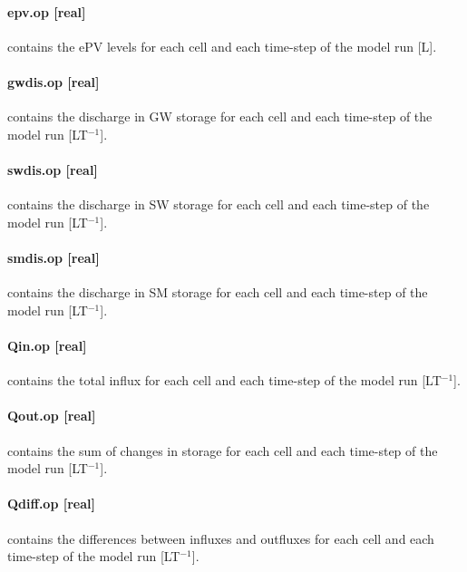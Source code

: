 \paragraph*{epv.op [real]} contains the ePV levels for each cell and each time-step of the model run [L].

\paragraph*{gw\textunderscore dis.op [real]} contains the discharge in GW storage for each cell and each time-step of the model run [LT$^{-1}$].

\paragraph*{sw\textunderscore dis.op [real]} contains the discharge in SW storage for each cell and each time-step of the model run [LT$^{-1}$].

\paragraph*{sm\textunderscore dis.op [real]} contains the discharge in SM storage for each cell and each time-step of the model run [LT$^{-1}$].

\paragraph*{Qin.op [real]} contains the total influx for each cell and each time-step of the model run [LT$^{-1}$].

\paragraph*{Qout.op [real]} contains the sum of changes in storage for each cell and each time-step of the model run [LT$^{-1}$].

\paragraph*{Qdiff.op [real]} contains the differences between influxes and outfluxes for each cell and each time-step of the model run [LT$^{-1}$].
\\ \\


